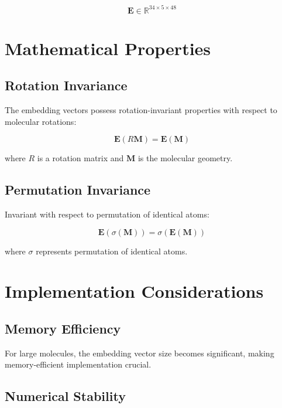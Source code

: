 \documentclass[12pt]{article}
\begin{document}
\begin{equation}
\mathbf{E} \in \mathbb{R}^{34 \times 5 \times 48}
\end{equation}

\section{Mathematical Properties}

\subsection{Rotation Invariance}

The embedding vectors possess rotation-invariant properties with respect to molecular rotations:

\begin{equation}
\mathbf{E}(R\mathbf{M}) = \mathbf{E}(\mathbf{M})
\end{equation}

where $R$ is a rotation matrix and $\mathbf{M}$ is the molecular geometry.

\subsection{Permutation Invariance}

Invariant with respect to permutation of identical atoms:

\begin{equation}
\mathbf{E}(\sigma(\mathbf{M})) = \sigma(\mathbf{E}(\mathbf{M}))
\end{equation}

where $\sigma$ represents permutation of identical atoms.

\section{Implementation Considerations}

\subsection{Memory Efficiency}

For large molecules, the embedding vector size becomes significant, making memory-efficient implementation crucial.

\subsection{Numerical Stability}
\end{document}
